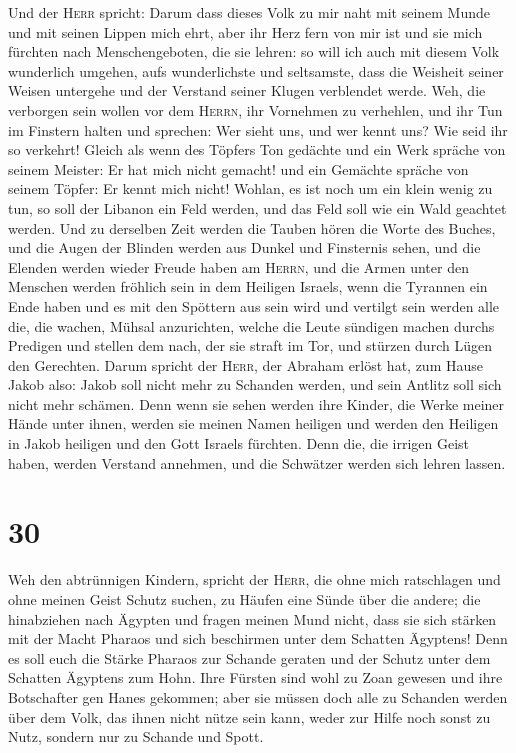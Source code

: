  Und der \textsc{Herr} spricht: Darum dass dieses Volk zu
mir naht mit seinem Munde und mit seinen Lippen mich ehrt, aber ihr Herz
fern von mir ist und sie mich fürchten nach Menschengeboten, die sie
lehren:  so will ich auch mit diesem Volk wunderlich
umgehen, aufs wunderlichste und seltsamste, dass die Weisheit seiner
Weisen untergehe und der Verstand seiner Klugen verblendet werde.
 Weh, die verborgen sein wollen vor dem \textsc{Herrn},
ihr Vornehmen zu verhehlen, und ihr Tun im Finstern halten und sprechen:
Wer sieht uns, und wer kennt uns?  Wie seid ihr so
verkehrt! Gleich als wenn des Töpfers Ton gedächte und ein Werk spräche
von seinem Meister: Er hat mich nicht gemacht! und ein Gemächte spräche
von seinem Töpfer: Er kennt mich nicht!  Wohlan, es ist
noch um ein klein wenig zu tun, so soll der Libanon ein Feld werden, und
das Feld soll wie ein Wald geachtet werden.  Und zu
derselben Zeit werden die Tauben hören die Worte des Buches, und die
Augen der Blinden werden aus Dunkel und Finsternis sehen,
 und die Elenden werden wieder Freude haben am
\textsc{Herrn}, und die Armen unter den Menschen werden fröhlich sein in
dem Heiligen Israels,  wenn die Tyrannen ein Ende haben
und es mit den Spöttern aus sein wird und vertilgt sein werden alle die,
die wachen, Mühsal anzurichten,  welche die Leute
sündigen machen durchs Predigen und stellen dem nach, der sie straft im
Tor, und stürzen durch Lügen den Gerechten.  Darum
spricht der \textsc{Herr}, der Abraham erlöst hat, zum Hause Jakob also:
Jakob soll nicht mehr zu Schanden werden, und sein Antlitz soll sich
nicht mehr schämen.  Denn wenn sie sehen werden ihre
Kinder, die Werke meiner Hände unter ihnen, werden sie meinen Namen
heiligen und werden den Heiligen in Jakob heiligen und den Gott Israels
fürchten.  Denn die, die irrigen Geist haben, werden
Verstand annehmen, und die Schwätzer werden sich lehren lassen.

\hypertarget{section-29}{%
\section{30}\label{section-29}}

 Weh den abtrünnigen Kindern, spricht der \textsc{Herr},
die ohne mich ratschlagen und ohne meinen Geist Schutz suchen, zu Häufen
eine Sünde über die andere;  die hinabziehen nach Ägypten
und fragen meinen Mund nicht, dass sie sich stärken mit der Macht
Pharaos und sich beschirmen unter dem Schatten Ägyptens! 
Denn es soll euch die Stärke Pharaos zur Schande geraten und der Schutz
unter dem Schatten Ägyptens zum Hohn.  Ihre Fürsten sind
wohl zu Zoan gewesen und ihre Botschafter gen Hanes gekommen;
 aber sie müssen doch alle zu Schanden werden über dem
Volk, das ihnen nicht nütze sein kann, weder zur Hilfe noch sonst zu
Nutz, sondern nur zu Schande und Spott.

